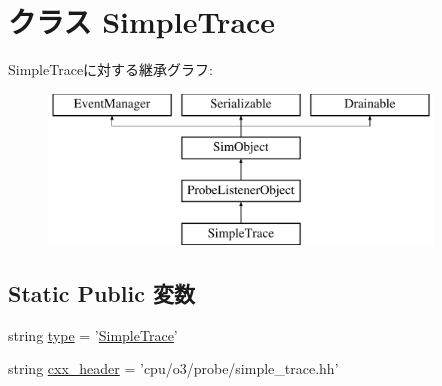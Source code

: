 \hypertarget{classSimpleTrace_1_1SimpleTrace}{
\section{クラス SimpleTrace}
\label{classSimpleTrace_1_1SimpleTrace}
}
SimpleTraceに対する継承グラフ:\begin{figure}[H]
\begin{center}
\leavevmode
\includegraphics[height=4cm]{classSimpleTrace_1_1SimpleTrace}
\end{center}
\end{figure}
\subsection*{Static Public 変数}
\begin{DoxyCompactItemize}
\item 
string \hyperlink{classSimpleTrace_1_1SimpleTrace_acce15679d830831b0bbe8ebc2a60b2ca}{type} = '\hyperlink{classSimpleTrace_1_1SimpleTrace}{SimpleTrace}'
\item 
string \hyperlink{classSimpleTrace_1_1SimpleTrace_a17da7064bc5c518791f0c891eff05fda}{cxx\_\-header} = 'cpu/o3/probe/simple\_\-trace.hh'
\end{DoxyCompactItemize}


